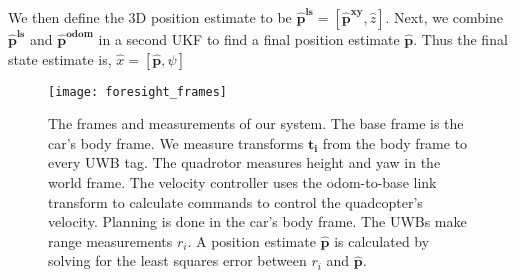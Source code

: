 %

We then define the 3D position estimate to be $\bm{\hat{p}^{ls}} = [\bm{\hat{p}^{xy}}, \hat{z}]$. Next, we combine $\bm{\hat{p}^{ls}}$ and $\bm{\hat{p}^{\text{odom}}}$ in a second UKF to find a final position estimate $\bm{\hat{p}}$. Thus the final state estimate is, $\hat{x} = [\bm{\hat{p}}, \psi]$


\begin{figure}[tb!]
  \centering
    \texttt{[image: foresight\_frames]}
  \caption{The frames and measurements of our system. The base frame
   is the car's body frame. We measure transforms $\bm{t_{i}}$ from the body
   frame to every UWB tag. The quadrotor measures height and yaw in the world
   frame. The velocity controller uses the odom-to-base\textunderscore 
   link transform to calculate commands to control the quadcopter's velocity.
   Planning is done in the car's body frame.
   The UWBs make range measurements $r_{i}$. A position estimate $\bm{\hat{p}}$
   is calculated by solving for the least squares error between $r_{i}$ and $\bm{\hat{p}}$.}
  \label{fig:frames}
\end{figure}







